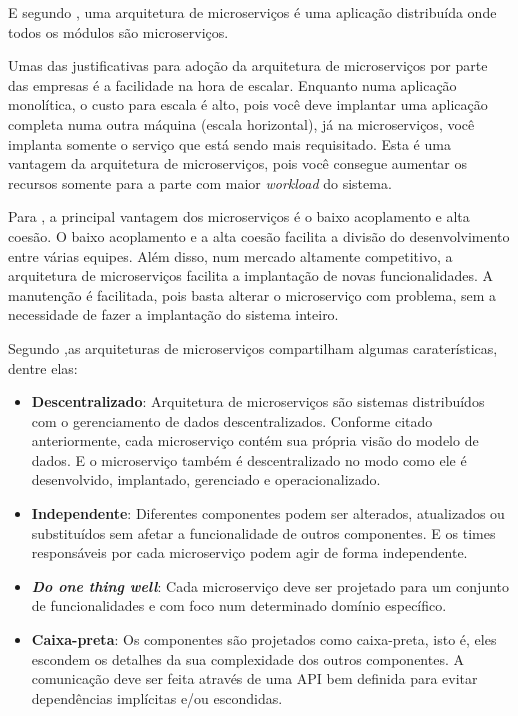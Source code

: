 \documentclass[12pt]{article}
\theoremstyle{plain}
\begin{document}
E segundo \cite{Dragoni2017}, uma arquitetura de microserviços é uma aplicação distribuída onde todos os módulos são microserviços.

Umas das justificativas para adoção da arquitetura de microserviços por parte das empresas é a facilidade na hora de escalar. Enquanto numa aplicação monolítica, o custo para escala é alto, pois você deve implantar uma aplicação completa numa outra máquina (escala horizontal), já na microserviços, você implanta somente o serviço que está sendo mais requisitado. Esta é uma vantagem da arquitetura de microserviços, pois você consegue aumentar os recursos somente para a parte com maior \textit{workload} do sistema. 

Para \cite{wolf:2018}, a principal vantagem dos microserviços é o baixo acoplamento e alta coesão. O baixo acoplamento e a alta coesão facilita a divisão do desenvolvimento entre várias equipes. Além disso, num mercado altamente competitivo, a arquitetura de microserviços facilita a implantação de novas funcionalidades. A manutenção é facilitada, pois basta alterar o microserviço com problema, sem a necessidade de fazer a implantação do sistema inteiro.

Segundo \cite{jung:2017},as arquiteturas de microserviços compartilham algumas caraterísticas, dentre elas:

\begin{itemize}
    \item \textbf{Descentralizado}: Arquitetura de microserviços são sistemas distribuídos com o gerenciamento de dados descentralizados. Conforme citado anteriormente, cada microserviço contém sua própria visão do modelo de dados. E o microserviço também é descentralizado no modo como ele é desenvolvido, implantado, gerenciado e operacionalizado.
    \item \textbf{Independente}: Diferentes componentes podem ser alterados, atualizados ou substituídos sem afetar a funcionalidade de outros componentes. E os times responsáveis por cada microserviço podem agir de forma independente.
    \item \textbf{\textit{Do one thing well}}: Cada microserviço deve ser projetado para um conjunto de funcionalidades e com foco num determinado domínio específico.
    \item \textbf{Caixa-preta}: Os componentes são projetados como caixa-preta, isto é, eles escondem os detalhes da sua complexidade dos outros componentes. A comunicação deve ser feita através de uma API bem definida para evitar dependências implícitas e/ou escondidas.
\end{itemize}
\end{document}
